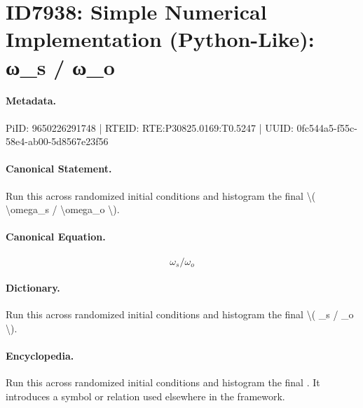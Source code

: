 \section*{ID7938: Simple Numerical Implementation (Python-Like): ω\_s / ω\_o}
\paragraph{Metadata.}
PiID: 9650226291748 | RTEID: RTE:P30825.0169:T0.5247 | UUID: 0fc544a5-f55c-58e4-ab00-5d8567e23f56

\paragraph{Canonical Statement.}
Run this across randomized initial conditions and histogram the final \textbackslash{}( \textbackslash{}omega\_s / \textbackslash{}omega\_o \textbackslash{}).

\paragraph{Canonical Equation.}
\[
\omega_s / \omega_o
\]

\paragraph{Dictionary.}
Run this across randomized initial conditions and histogram the final \textbackslash{}( \_s / \_o \textbackslash{}).

\paragraph{Encyclopedia.}
Run this across randomized initial conditions and histogram the final . It introduces a symbol or relation used elsewhere in the framework.
